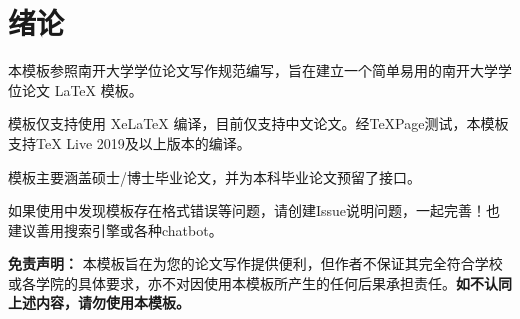 
\chapter{绪论}
本模板参照南开大学学位论文写作规范编写，旨在建立一个简单易用的南开大学学位论文 LaTeX 模板。

模板仅支持使用 XeLaTeX 编译，目前仅支持中文论文。经TeXPage测试，本模板支持TeX Live 2019及以上版本的编译。

模板主要涵盖硕士/博士毕业论文，并为本科毕业论文预留了接口。



如果使用中发现模板存在格式错误等问题，请创建Issue说明问题，一起完善！也建议善用搜索引擎或各种chatbot。

\textbf{免责声明：} 本模板旨在为您的论文写作提供便利，但作者不保证其完全符合学校或各学院的具体要求，亦不对因使用本模板所产生的任何后果承担责任。\textbf{如不认同上述内容，请勿使用本模板。}

